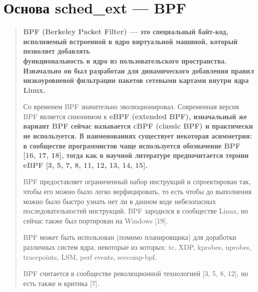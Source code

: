 \documentclass[12pt, oneside]{book}
\begin{document}
\section{Основа sched\_ext --- BPF}
\begin{quote}
  \bf BPF \normalfont (Berkeley Packet Filter) --- это специальный байт-код,
  исполняемый встроенной в ядро виртуальной машиной, который
  позволяет добавлять\\ функциональность в ядро из пользовательского пространства.
  Изначально он был разработан для динамического добавления правил низкоуровневой
  фильтрации пакетов сетевыми картами внутри ядра Linux.

  Со временем BPF значительно эволюционировал. Современная версия BPF является
  синонимом к \bf eBPF \normalfont (extended BPF), изначальный же вариант BPF сейчас
  называется cBPF (classic BPF) и практически не используется. В наименованиях
  существует некоторая асимметрия: в сообществе программистов чаще используется
  обозначение BPF [16, 17, 18], тогда как в научной литературе предпочитается
  термин eBPF [3, 5, 7, 8, 11, 12, 13, 14, 15].

  BPF предоставляет ограниченный набор инструкций и спроектирован так,
  чтобы его можно было легко верфицировать, то есть чтобы до выполнения 
  можно было быстро узнать нет ли в данном коде небезопасных последовательностей
  инструкций. BPF зародился в сообществе Linux, но сейчас также был портирован
  на Windows [19].
  
  BPF может быть использован (помимо планировщика) для доработки различных
  систем ядра, некоторые из которых: tc, XDP,
  kprobes, uprobes,\\ tracepoints, LSM, perf events, seccomp-bpf.

  BPF считается в сообществе революционной технологией [3, 5, 8, 12], но есть также
  и критика [7].
\end{quote}
\end{document}
